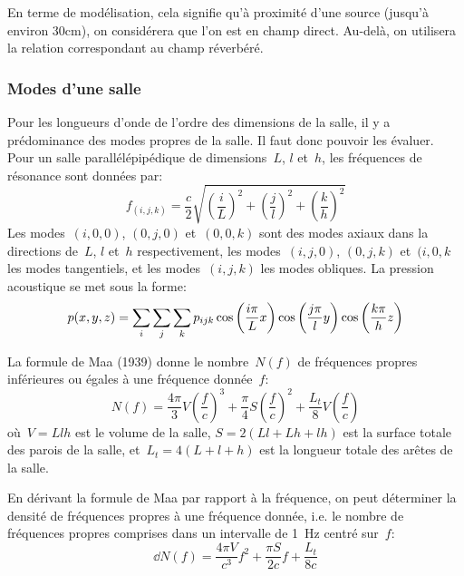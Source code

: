 {\medskip
En terme de modélisation, cela signifie qu'à proximité d'une source (jusqu'à environ 30cm), on considérera que l'on est en champ direct. Au-delà, on utilisera la relation correspondant au champ réverbéré.



\medskip
\subsubsection{Modes d'une salle}

Pour les longueurs d'onde de l'ordre des dimensions de la salle, il y a prédominance des modes propres de la salle. Il faut donc pouvoir les évaluer.
Pour un salle parallélépipédique de dimensions~$L$, $l$ et~$h$, les fréquences de résonance sont données par:
\begin{equation}
f_{(i,j,k)} = \frac{c}2\sqrt{\left(\frac{i}{L}\right)^2+\left(\frac{j}{l}\right)^2+\left(\frac{k}{h}\right)^2}
\end{equation}
Les modes~$(i,0,0)$, $(0,j,0)$ et~$(0,0,k)$ sont des modes axiaux dans la directions de~$L$, $l$ et~$h$ respectivement, les modes~$(i,j,0)$, $(0,j,k)$ et~$(i,0,k$ les modes tangentiels, et les modes~$(i,j,k)$ les modes obliques.
La pression acoustique se met sous la forme:
\begin{equation}
p(x,y,z) = \displaystyle\sum_i\displaystyle\sum_j\displaystyle\sum_k p_{ijk}\cos\left(\frac{i\pi}{L}x\right)\cos\left(\frac{j\pi}{l}y\right)\cos\left(\frac{k\pi}{h}z\right)
\end{equation}

La formule de Maa (1939) donne le nombre~$N(f)$ de fréquences propres inférieures ou égales à une fréquence donnée~$f$:
\begin{equation}
N(f) = \frac{4\pi}{3}V\left(\frac{f}{c}\right)^3 + \frac{\pi}{4}S\left(\frac{f}{c}\right)^2 + \frac{L_t}{8}V\left(\frac{f}{c}\right)
\end{equation}
où~$V=Llh$ est le volume de la salle, $S=2(Ll+Lh+lh)$ est la surface totale des parois de la salle, et~$L_t=4(L+l+h)$ est la longueur totale des arêtes de la salle.

En dérivant la formule de Maa par rapport à la fréquence, on peut déterminer la
densité de fréquences propres à une fréquence donnée, i.e. le nombre de fréquences propres comprises dans un intervalle de 1~Hz centré sur~$f$:
\begin{equation}
\dd N(f) = \frac{4\pi V}{c^3}f^2 + \frac{\pi S}{2c}f + \frac{L_t}{8c}
\end{equation}

}
